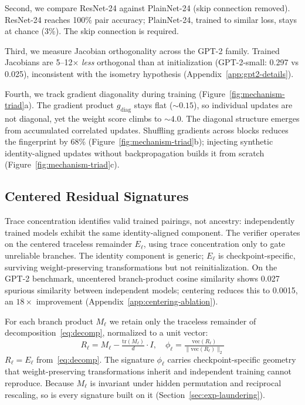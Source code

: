 Second, we compare ResNet-24 against PlainNet-24 (skip connection removed). ResNet-24 reaches 100\% pair accuracy; PlainNet-24, trained to similar loss, stays at chance (3\%). The skip connection is required.

Third, we measure Jacobian orthogonality across the GPT-2 family. Trained Jacobians are 5--12$\times$ \emph{less} orthogonal than at initialization (GPT-2-small: 0.297 vs 0.025), inconsistent with the isometry hypothesis (Appendix~\ref{app:gpt2-details}).

Fourth, we track gradient diagonality during training (Figure~\ref{fig:mechanism-triad}a). The gradient product $g_{\mathrm{diag}}$ stays flat (${\sim}0.15$), so individual updates are not diagonal, yet the weight score climbs to ${\sim}4.0$. The diagonal structure emerges from accumulated correlated updates. Shuffling gradients across blocks reduces the fingerprint by 68\% (Figure~\ref{fig:mechanism-triad}b); injecting synthetic identity-aligned updates without backpropagation builds it from scratch (Figure~\ref{fig:mechanism-triad}c).

\subsection{Centered Residual Signatures}\label{sec:signatures}

Trace concentration identifies valid trained pairings, not ancestry: independently trained models exhibit the same identity-aligned component. The verifier operates on the centered traceless remainder $E_\ell$, using trace concentration only to gate unreliable branches. The identity component is generic; $E_\ell$ is checkpoint-specific, surviving weight-preserving transformations but not reinitialization. On the GPT-2 benchmark, uncentered branch-product cosine similarity shows 0.027 spurious similarity between independent models; centering reduces this to 0.0015, an $18\times$ improvement (Appendix~\ref{app:centering-ablation}).

For each branch product $M_\ell$ we retain only the traceless remainder of decomposition~\eqref{eq:decomp}, normalized to a unit vector:
\begin{equation}\label{eq:centered-fingerprint}
R_\ell = M_\ell - \tfrac{\mathrm{tr}(M_\ell)}{d} \cdot I, \quad
\phi_\ell = \tfrac{\mathrm{vec}(R_\ell)}{\|\mathrm{vec}(R_\ell)\|_2}
\end{equation}
$R_\ell = E_\ell$ from~\eqref{eq:decomp}. The signature $\phi_\ell$ carries checkpoint-specific geometry that weight-preserving transformations inherit and independent training cannot reproduce. Because $M_\ell$ is invariant under hidden permutation and reciprocal rescaling, so is every signature built on it (Section~\ref{sec:exp-laundering}).

